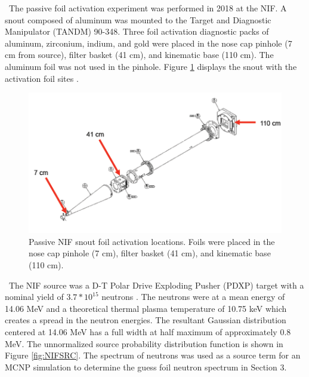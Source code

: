 \documentclass[journal]{IEEEtran}
\let\MYoriglatexcaption\caption
\renewcommand{\caption}[2][\relax]{\MYoriglatexcaption[#2]{#2}}
\begin{document}
\ The passive foil activation experiment was performed in 2018 at the NIF. A snout composed of aluminum was mounted to the Target and Diagnostic Manipulator (TANDM) 90-348. Three foil activation diagnostic packs of aluminum, zirconium, indium, and gold were placed in the nose cap pinhole (7 cm from source), filter basket (41 cm), and kinematic base (110 cm). The aluminum foil was not used in the pinhole. Figure \ref{fig:NIF} displays the snout with the activation foil sites \cite{Bogetic}. 

\begin{figure}[h!]
	\includegraphics[width=\linewidth]{Figures/NIF.png}
	\caption{Passive NIF snout foil activation locations.  Foils were placed in the nose cap pinhole (7 cm), filter basket (41 cm), and kinematic base (110 cm).}
	\label{fig:NIF}
\end{figure}

\ The NIF source was a D-T Polar Drive Exploding Pusher (PDXP) target with a nominal yield of  $3.7*10^{15}$ neutrons \cite{NIFSrc}. The neutrons were at a mean energy of 14.06 MeV and a theoretical thermal plasma temperature of 10.75 keV which creates a spread in the neutron energies. The resultant Gaussian distribution centered at 14.06 MeV has a full width at half maximum of approximately 0.8 MeV\cite{Appelbe}. The unnormalized source probability distribution function is shown in Figure \ref{fig:NIFSRC}. The spectrum of neutrons was used as a source term for an MCNP simulation to determine the guess foil neutron spectrum in Section 3. 
\end{document}
